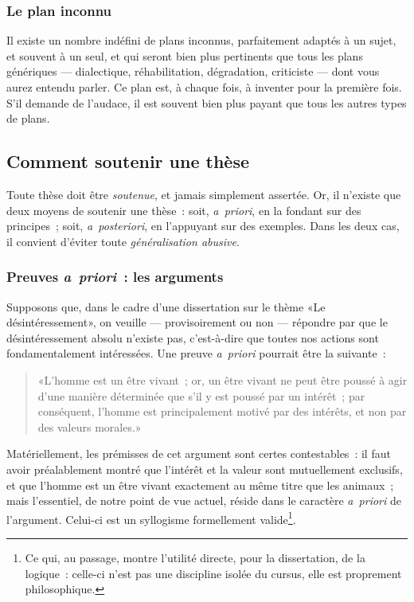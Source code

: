 \documentclass[a4paper,11pt]{article}
\newcommand{\cad}{c'est-à-dire}
\newcommand{\apr}{\emph{a~priori}}
\newcommand{\apost}{\emph{a~posteriori}}
\begin{document}
\subsubsection{Le plan inconnu}

Il existe un nombre indéfini de plans inconnus, parfaitement adaptés à
un sujet, et souvent à un seul, et qui seront bien plus pertinents que
tous les plans génériques --- dialectique, réhabilitation, dégradation,
criticiste --- dont vous aurez entendu parler. Ce plan est, à chaque
fois, à inventer pour la première fois. S'il demande de l'audace, il est
souvent bien plus payant que tous les autres types de plans.



\subsection{Comment soutenir une thèse}

Toute thèse doit être \emph{soutenue}, et jamais simplement
assertée. Or, il n'existe que deux moyens de soutenir une thèse~: soit,
\apr{}, en la fondant sur des principes~; soit, \apost{}, en l'appuyant
sur des exemples. Dans les deux cas, il convient d'éviter toute
\emph{généralisation abusive}.


\subsubsection{Preuves \apr{}~: les arguments}

Supposons que, dans le cadre d'une dissertation sur le thème «Le
désintéressement», on veuille --- provisoirement ou non --- répondre par
que le désintéressement absolu n'existe pas, \cad{} que toutes nos
actions sont fondamentalement intéressées. Une preuve \apr{} pourrait
être la suivante~:
\begin{quote}
  «L'homme est un être vivant~; or, un être vivant ne peut être poussé à
  agir d'une manière déterminée que s'il y est poussé par un intérêt~;
  par conséquent, l'homme est principalement motivé par des intérêts, et
  non par des valeurs morales.»
\end{quote}
Matériellement, les prémisses de cet argument sont certes contestables~:
il faut avoir préalablement montré que l'intérêt et la valeur sont
mutuellement exclusifs, et que l'homme est un être vivant exactement au
même titre que les animaux~; mais l'essentiel, de notre point de vue
actuel, réside dans le caractère \apr{} de l'argument. Celui-ci est un
syllogisme formellement valide\footnote{Ce qui, au passage, montre
  l'utilité directe, pour la dissertation, de la logique~: celle-ci
  n'est pas une discipline isolée du cursus, elle est proprement
  philosophique.}.
\end{document}

